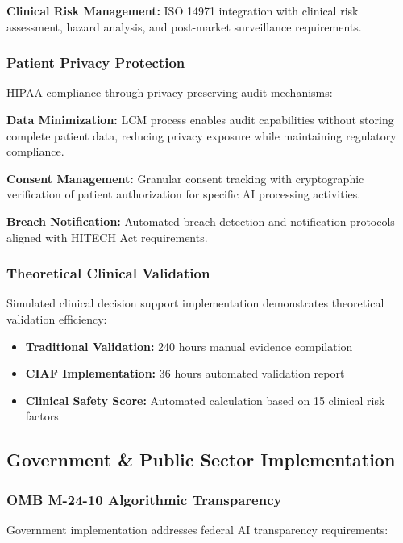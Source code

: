 \documentclass[12pt,a4paper]{article}
\begin{document}
\textbf{Clinical Risk Management:} ISO 14971 integration with clinical risk assessment, hazard analysis, and post-market surveillance requirements.

\subsubsection{Patient Privacy Protection}

HIPAA compliance through privacy-preserving audit mechanisms:

\textbf{Data Minimization:} LCM process enables audit capabilities without storing complete patient data, reducing privacy exposure while maintaining regulatory compliance.

\textbf{Consent Management:} Granular consent tracking with cryptographic verification of patient authorization for specific AI processing activities.

\textbf{Breach Notification:} Automated breach detection and notification protocols aligned with HITECH Act requirements.

\subsubsection{Theoretical Clinical Validation}

Simulated clinical decision support implementation demonstrates theoretical validation efficiency:

\begin{itemize}
\item \textbf{Traditional Validation:} 240 hours manual evidence compilation
\item \textbf{CIAF Implementation:} 36 hours automated validation report
\item \textbf{Clinical Safety Score:} Automated calculation based on 15 clinical risk factors
\end{itemize}

\subsection{Government \& Public Sector Implementation}

\subsubsection{OMB M-24-10 Algorithmic Transparency}

Government implementation addresses federal AI transparency requirements:
\end{document}
